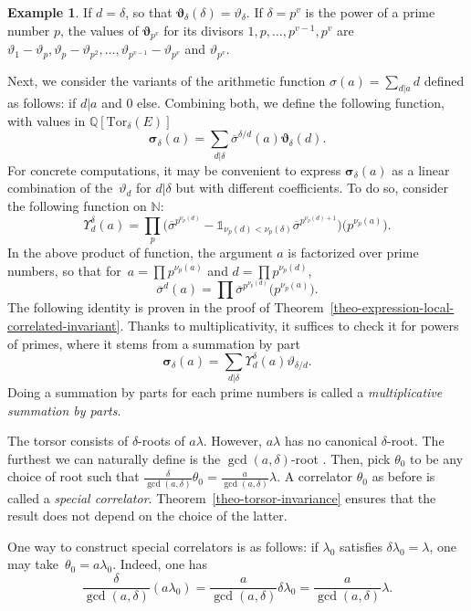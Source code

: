 \documentclass[11pt]{article}
\numberwithin{equation}{section}
\newcommand{\Tor}{\mathrm{Tor}}
\newcommand{\NN}{\mathbb{N}}
\newcommand{\QQ}{\mathbb{Q}}
\numberwithin{equation}{section}
\theoremstyle{definition}
\newtheorem{expl}[theo]{Example}
\begin{document}
\begin{expl}
 If $d=\delta$, so that $\boldsymbol{\vartheta}_\delta(\delta) =\vartheta_\delta$. If $\delta=p^v$ is the power of a prime number $p$, the values of $\boldsymbol{\vartheta}_{p^v}$ for its divisors $1,p,\dots,p^{v-1},p^v$ are
 $\vartheta_1-\vartheta_p,\vartheta_p-\vartheta_{p^2},\dots, \vartheta_{p^{v-1}}-\vartheta_{p^v}$ and $\vartheta_{p^v}$.
\end{expl}

Next, we consider the variants of the arithmetic function $\sigma(a)=\sum_{d| a}d$ defined as follows:  if $d|a$ and $0$ else. Combining both, we define the following function, with values in $\QQ[\Tor_\delta(E)]$
\[ \boldsymbol{\sigma}_\delta(a)=\sum_{d|\delta}\overline{\sigma}^{\delta/d}(a)\boldsymbol{\vartheta}_\delta(d). \]
For concrete computations, it may be convenient to express $\boldsymbol{\sigma}_\delta(a)$ as a linear combination of the~$\vartheta_d$ for $d|\delta$ but with different coefficients. To do so, consider the following function on $\NN$:
\[
\Upsilon^\delta_d(a) = \prod_p \bigl(\overline{\sigma}^{p^{\nu_p(d)}}-\mathds{1}_{\nu_p(d)<\nu_p(\delta)}\overline{\sigma}^{p^{\nu_p(d)+1}} \bigr)\bigl(p^{\nu_p(a)}\bigr).
\]
In the above product of function, the argument $a$ is factorized over prime numbers, so that for~$a=\prod p^{\nu_p(a)}$ and $d=\prod p^{\nu_p(d)}$,
\[ \overline{\sigma}^d(a)=\prod\overline{\sigma}^{p^{\nu_p(d)}}\bigl(p^{\nu_p(a)}\bigr). \]
The following identity is proven in the proof of Theorem~\ref{theo-expression-local-correlated-invariant}. Thanks to multiplicativity, it suffices to check it for powers of primes, where it stems from a summation by part
\[ \boldsymbol{\sigma}_\delta(a)=\sum_{d|\delta}\Upsilon_d^\delta(a)\vartheta_{\delta/d}. \]
Doing a summation by parts for each prime numbers is called a \textit{multiplicative summation by parts}.

The torsor consists of $\delta$-roots of $a\lambda$. However, $a\lambda$ has no canonical $\delta$-root. The furthest we can naturally define is the $\gcd(a,\delta)$-root . Then, pick $\theta_0$ to be any choice of root such that $\frac{\delta}{\gcd(a,\delta)}\theta_0 = \frac{a}{\gcd(a,\delta)}\lambda$. A correlator $\theta_0$ as before is called a \textit{special correlator}. Theorem~\ref{theo-torsor-invariance} ensures that the result does not depend on the choice of the latter.

One way to construct special correlators is as follows: if $\lambda_0$ satisfies $\delta\lambda_0=\lambda$, one may take~${\theta_0=a\lambda_0}$. Indeed, one has
\[ \frac{\delta}{\gcd(a,\delta)}(a\lambda_0) = \frac{a}{\gcd(a,\delta)}\delta\lambda_0 = \frac{a}{\gcd(a,\delta)}\lambda. \]
\end{document}
